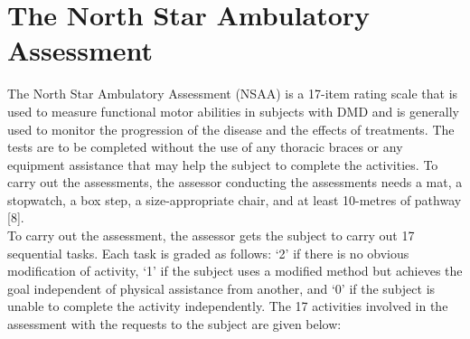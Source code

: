 \documentclass[12pt,twoside]{report}
\begin{document}
\section{The North Star Ambulatory Assessment}

\quad The North Star Ambulatory Assessment (NSAA) is a 17-item rating scale that is used to measure functional motor abilities in subjects with DMD and is generally used to monitor the progression of the disease and the effects of treatments. The tests are to be completed without the use of any thoracic braces or any equipment assistance that may help the subject to complete the activities. To carry out the assessments, the assessor conducting the assessments needs a mat, a stopwatch, a box step, a size-appropriate chair, and at least 10-metres of pathway [8].\\

\quad To carry out the assessment, the assessor gets the subject to carry out 17 sequential tasks. Each task is graded as follows: ‘2’ if there is no obvious modification of activity, ‘1’ if the subject uses a modified method but achieves the goal independent of physical assistance from another, and ‘0’ if the subject is unable to complete the activity independently. The 17 activities involved in the assessment with the requests to the subject are given below:
\end{document}
